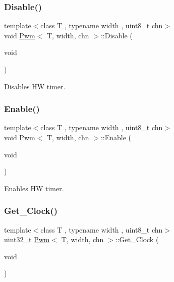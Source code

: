 \subsubsection{\texorpdfstring{Disable()}{Disable()}}
{\footnotesize\ttfamily template$<$class T , typename width , uint8\+\_\+t chn$>$ \\
void \mbox{\hyperlink{class_pwm}{Pwm}}$<$ T, width, chn $>$\+::Disable (\begin{DoxyParamCaption}\item[{void}]{ }\end{DoxyParamCaption})}



Disables HW timer. 

\mbox{\label{class_pwm_a2a485a88f3146158b18c5ce918dcdcf4}} 
\subsubsection{\texorpdfstring{Enable()}{Enable()}}
{\footnotesize\ttfamily template$<$class T , typename width , uint8\+\_\+t chn$>$ \\
void \mbox{\hyperlink{class_pwm}{Pwm}}$<$ T, width, chn $>$\+::Enable (\begin{DoxyParamCaption}\item[{void}]{ }\end{DoxyParamCaption})}



Enables HW timer. 

\mbox{\label{class_pwm_aac8124330f23ecedd57c709f8834cb4a}} 
\subsubsection{\texorpdfstring{Get\_Clock()}{Get\_Clock()}}
{\footnotesize\ttfamily template$<$class T , typename width , uint8\+\_\+t chn$>$ \\
uint32\+\_\+t \mbox{\hyperlink{class_pwm}{Pwm}}$<$ T, width, chn $>$\+::Get\+\_\+\+Clock (\begin{DoxyParamCaption}\item[{void}]{ }\end{DoxyParamCaption})}



